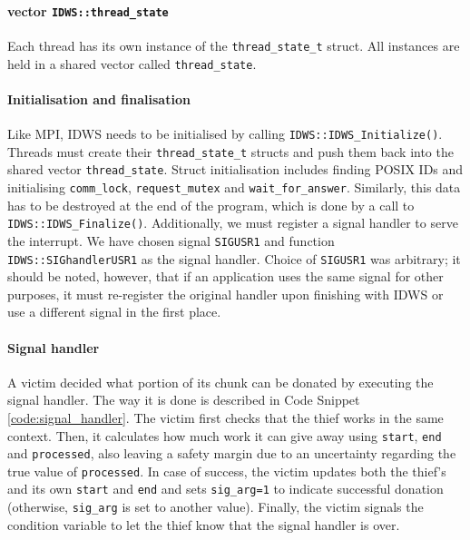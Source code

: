 \documentclass{acm_proc_article-sp}
\begin{document}
\paragraph{vector \texttt{IDWS::thread\_state}}
Each thread has its own instance of the \texttt{thread\_state\_t} struct. All 
instances are held in a shared vector called \texttt{thread\_state}.

\paragraph{Initialisation and finalisation}
Like MPI, IDWS needs to be initialised by calling 
\texttt{IDWS::IDWS\_Initialize()}. Threads must create their 
\texttt{thread\_state\_t} structs and push them back into the shared vector
\texttt{thread\_state}. Struct initialisation includes finding POSIX IDs and 
initialising \texttt{comm\_lock}, \texttt{request\_mutex} and 
\texttt{wait\_for\_answer}. Similarly, this data has to be destroyed at the end 
of the program, which is done by a call to \texttt{IDWS::IDWS\_Finalize()}. 
Additionally, we must register a signal handler to serve the interrupt. We have 
chosen signal \texttt{SIGUSR1} and function \texttt{IDWS::SIGhandlerUSR1} as 
the signal handler. Choice of \texttt{SIGUSR1} was arbitrary; it should be 
noted, however, that if an application uses the same signal for other purposes, 
it must re-register the original handler upon finishing with IDWS or use a 
different signal in the first place.

\paragraph{Signal handler}
A victim decided what portion of its chunk can be donated by executing the 
signal handler. The way it is done is described in Code Snippet 
\ref{code:signal_handler}. The victim first checks that the thief works in the 
same context. Then, it calculates how much work it can give away using 
\texttt{start}, \texttt{end} and \texttt{processed}, also leaving a safety 
margin due to an uncertainty regarding the true value of \texttt{processed}. In 
case of success, the victim updates both the thief's and its own \texttt{start} 
and \texttt{end} and sets \texttt{sig\_arg=1} to indicate successful donation 
(otherwise, \texttt{sig\_arg} is set to another value). Finally, the victim 
signals the condition variable to let the thief know that the signal handler is 
over.
\end{document}
